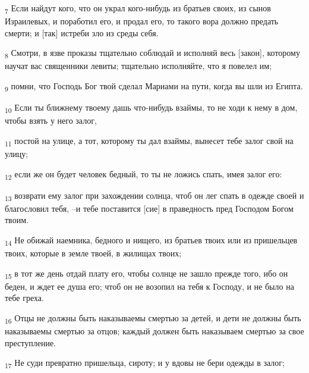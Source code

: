 \begin{tcolorbox}
\textsubscript{7} Если найдут кого, что он украл кого-нибудь из братьев своих, из сынов Израилевых, и поработил его, и продал его, то такого вора должно предать смерти; и [так] истреби зло из среды себя.
\end{tcolorbox}
\begin{tcolorbox}
\textsubscript{8} Смотри, в язве проказы тщательно соблюдай и исполняй весь [закон], которому научат вас священники левиты; тщательно исполняйте, что я повелел им;
\end{tcolorbox}
\begin{tcolorbox}
\textsubscript{9} помни, что Господь Бог твой сделал Мариами на пути, когда вы шли из Египта.
\end{tcolorbox}
\begin{tcolorbox}
\textsubscript{10} Если ты ближнему твоему дашь что-нибудь взаймы, то не ходи к нему в дом, чтобы взять у него залог,
\end{tcolorbox}
\begin{tcolorbox}
\textsubscript{11} постой на улице, а тот, которому ты дал взаймы, вынесет тебе залог свой на улицу;
\end{tcolorbox}
\begin{tcolorbox}
\textsubscript{12} если же он будет человек бедный, то ты не ложись спать, имея залог его:
\end{tcolorbox}
\begin{tcolorbox}
\textsubscript{13} возврати ему залог при захождении солнца, чтоб он лег спать в одежде своей и благословил тебя, --и тебе поставится [сие] в праведность пред Господом Богом твоим.
\end{tcolorbox}
\begin{tcolorbox}
\textsubscript{14} Не обижай наемника, бедного и нищего, из братьев твоих или из пришельцев твоих, которые в земле твоей, в жилищах твоих;
\end{tcolorbox}
\begin{tcolorbox}
\textsubscript{15} в тот же день отдай плату его, чтобы солнце не зашло прежде того, ибо он беден, и ждет ее душа его; чтоб он не возопил на тебя к Господу, и не было на тебе греха.
\end{tcolorbox}
\begin{tcolorbox}
\textsubscript{16} Отцы не должны быть наказываемы смертью за детей, и дети не должны быть наказываемы смертью за отцов; каждый должен быть наказываем смертью за свое преступление.
\end{tcolorbox}
\begin{tcolorbox}
\textsubscript{17} Не суди превратно пришельца, сироту; и у вдовы не бери одежды в залог;
\end{tcolorbox}
